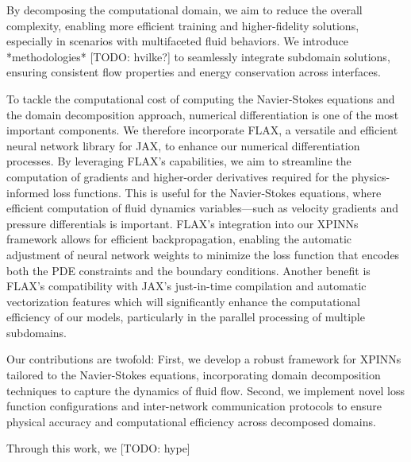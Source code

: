 By decomposing the computational domain, we aim to reduce the overall complexity, enabling more efficient training and higher-fidelity solutions, especially in scenarios with multifaceted fluid behaviors. We introduce *methodologies* [TODO: hvilke?] to seamlessly integrate subdomain solutions, ensuring consistent flow properties and energy conservation across interfaces. 

To tackle the computational cost of computing the Navier-Stokes equations and the domain decomposition approach, numerical differentiation is one of the most important components. We therefore incorporate FLAX, a versatile and efficient neural network library for JAX, to enhance our numerical differentiation processes. By leveraging FLAX's capabilities, we aim to streamline the computation of gradients and higher-order derivatives required for the physics-informed loss functions. This is useful for the Navier-Stokes equations, where efficient computation of fluid dynamics variables—such as velocity gradients and pressure differentials is important. FLAX's integration into our XPINNs framework allows for efficient backpropagation, enabling the automatic adjustment of neural network weights to minimize the loss function that encodes both the PDE constraints and the boundary conditions. Another benefit is FLAX's compatibility with JAX's just-in-time compilation and automatic vectorization features which will significantly enhance the computational efficiency of our models, particularly in the parallel processing of multiple subdomains.

Our contributions are twofold: First, we develop a robust framework for XPINNs tailored to the Navier-Stokes equations, incorporating domain decomposition techniques to capture the dynamics of fluid flow. Second, we implement novel loss function configurations and inter-network communication protocols to ensure physical accuracy and computational efficiency across decomposed domains.

Through this work, we [TODO: hype]